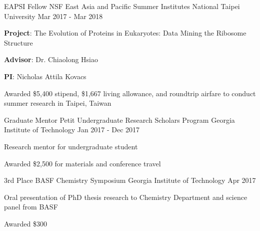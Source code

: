 

\begin{cventries}

  \cventry
    {EAPSI Fellow} %
    {NSF East Asia and Pacific Summer Institutes} %
    {National Taipei University} %
    {Mar 2017 - Mar 2018} %
    {
      \begin{cvitems} %
        \item {{\bf Project}: The Evolution of Proteins in Eukaryotes: Data Mining the Ribosome Structure}
        \item {{\bf Advisor}: Dr. Chiaolong Hsiao}
        \item {{\bf PI}: Nicholas Attila Kovacs}
        \item {Awarded \$5,400 stipend, \$1,667 living allowance, and roundtrip airfare to conduct summer research in Taipei, Taiwan}
      \end{cvitems}
    }

  \cventry
    {Graduate Mentor} %
    {Petit Undergraduate Research Scholars Program} %
    {Georgia Institute of Technology} %
    {Jan 2017 - Dec 2017} %
    {
      \begin{cvitems} %
        \item {Research mentor for undergraduate student}
        \item {Awarded \$2,500 for materials and conference travel}
      \end{cvitems}
    }

  \cventry
    {3rd Place} %
    {BASF Chemistry Symposium} %
    {Georgia Institute of Technology} %
    {Apr 2017} %
    {
      \begin{cvitems} %
      	\item {Oral presentation of PhD thesis research to Chemistry Department and science panel from BASF}
        \item {Awarded \$300}
      \end{cvitems}
    }
\vspace{-4.5mm}


\end{cventries}
